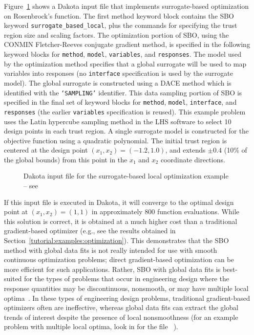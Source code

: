 Figure~\ref{sbm:sblm_rosen} shows a Dakota input file that implements
surrogate-based optimization on Rosenbrock's function.
The first method keyword block contains the SBO 
keyword \texttt{surrogate\_based\_local}, plus the commands for
specifying the trust region size and scaling factors. The optimization
portion of SBO, using the CONMIN Fletcher-Reeves conjugate gradient method,
is specified in the following keyword blocks for
\texttt{method}, \texttt{model}, \texttt{variables}, and
\texttt{responses}.  The model used by the optimization method 
specifies that a global surrogate will be used to map variables into
responses (no \texttt{interface} specification is used by the
surrogate model). The global surrogate is constructed using a DACE
method which is identified with the \texttt{`SAMPLING'} identifier.
This data sampling portion of SBO is specified in the final set of
keyword blocks for \texttt{method}, \texttt{model},
\texttt{interface}, and \texttt{responses} (the earlier 
\texttt{variables} specification is reused). This example problem uses 
the Latin hypercube sampling method in the LHS software to select 10
design points in each trust region. A single surrogate model is
constructed for the objective function using a quadratic polynomial.
The initial trust region is centered at the design point
$(x_1,x_2)=(-1.2,1.0)$, and extends $\pm 0.4$ (10\% of the global
bounds) from this point in the $x_1$ and $x_2$ coordinate directions.
\begin{figure}
  \begin{bigbox}
    \begin{tiny}
    \end{tiny}
  \end{bigbox}
  \caption{Dakota input file for the surrogate-based local optimization
    example --
see \protect{} }
  \label{sbm:sblm_rosen}
\end{figure}

If this input file is executed in Dakota, it will converge to the
optimal design point at $(x_{1},x_{2})=(1,1)$ in approximately 800
function evaluations. While this solution is correct, it is obtained
at a much higher cost than a traditional gradient-based optimizer
(e.g., see the results obtained in Section~\ref{tutorial:examples:optimization}).
This demonstrates that the SBO method with global data fits is not
really intended for use with smooth continuous optimization problems;
direct gradient-based optimization can be more efficient for such
applications. Rather, SBO with global data fits is best-suited for the
types of problems that occur in engineering design where the response
quantities may be discontinuous, nonsmooth, or may have multiple local
optima~\cite{Giu02}. In these types of engineering design problems,
traditional gradient-based optimizers often are ineffective, whereas
global data fits can extract the global trends of interest despite the
presence of local nonsmoothness (for an example problem with multiple
local optima, look in  for the file
~\cite{Giu00}).

